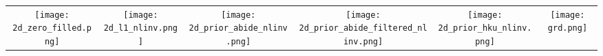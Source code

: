 
\begin{tabular}{c @{\hskip 0pt} c @{\hskip 0pt} c @{\hskip 0pt} c @{\hskip 0pt} c @{\hskip 0pt} c }
    \texttt{[image: 2d\_zero\_filled.png]}&
    \texttt{[image: 2d\_l1\_nlinv.png]}&
    \texttt{[image: 2d\_prior\_abide\_nlinv.png]}&
    \texttt{[image: 2d\_prior\_abide\_filtered\_nlinv.png]}&
    \texttt{[image: 2d\_prior\_hku\_nlinv.png]}&
    \texttt{[image: grd.png]}
   \end{tabular}